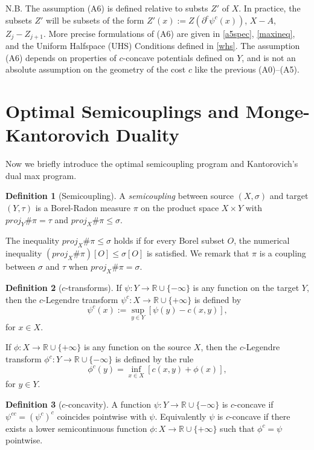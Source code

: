 \documentclass[12pt]{amsart}
\theoremstyle{definition}
\newtheorem{dfn}{Definition}
\theoremstyle{remark}
\newcommand{\bR}{\mathbb{R}}
\newcommand{\del}{\partial}
\begin{document}
N.B. The assumption (A6) is defined relative to substs $Z'$ of $X$. In practice, the subsets $Z'$ will be  subsets of the form $Z'(x):=Z(\del^c \psi^c(x))$, $X-A$, $Z_j - Z_{j+1}$. More precise formulations of (A6) are given in \ref{a5spec}, \eqref{maxineq}, and the Uniform Halfspace (UHS) Conditions defined in \ref{whs}. The assumption (A6) depends on properties of $c$-concave potentials defined on $Y$, and is not an absolute assumption on the geometry of the cost $c$ like the previous (A0)--(A5). 







\section{Optimal Semicouplings and Monge-Kantorovich Duality}\label{22-1}
Now we briefly introduce the optimal semicoupling program and Kantorovich's dual max program.  
\begin{dfn}[Semicoupling]
A \emph{semicoupling} between source $(X,\sigma)$ and target $(Y, \tau)$ is a Borel-Radon measure $\pi$ on the product space $X\times Y$ with $proj_Y \# \pi=\tau$ and $proj_X \# \pi \leq \sigma$. 
\end{dfn} The inequality $proj_X \# \pi \leq \sigma$ holds if for every Borel subset $O$, the numerical inequality $(proj_X \# \pi )[O]\leq \sigma[O]$ is satisfied. We remark that $\pi$ is a coupling between $\sigma$ and  $\tau$ when $proj_X \# \pi = \sigma$. 


\begin{dfn}[$c$-transforms]
If $\psi: Y\to \bR \cup \{-\infty\}$ is any function on the target $Y$, then the $c$-Legendre transform $\psi^c: X\to \bR \cup\{+\infty\}$ is defined by $$\psi^c (x):=\sup_{y\in Y} [\psi(y)-c(x,y)], $$ for $x\in X$. 

If $\phi: X \to \bR \cup \{+\infty \} $ is any function on the source $X$, then the $c$-Legendre transform $\phi^c: Y\to \bR \cup \{-\infty\}$ is defined by the rule $$\phi^c(y)=\inf_{x\in X} [c(x,y) + \phi(x)],$$ for $y\in Y$. 
\end{dfn}

\begin{dfn}
[$c$-concavity]\label{c-concavity}
A function $\psi: Y\to \bR \cup \{-\infty\}$ is $c$-concave if $\psi^{cc}=(\psi^{c})^c$ coincides pointwise with $\psi$. Equivalently $\psi$ is $c$-concave if there exists a lower semicontinuous function $\phi: X\to \bR \cup \{+\infty\}$ such that $\phi^c = \psi$ pointwise. 
\end{dfn}
\end{document}
